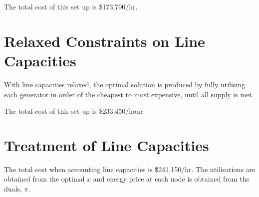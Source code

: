 \documentclass[11pt]{article}
\begin{document}
The total cost of this set up is \$173,790/hr.

\section{Relaxed Constraints on Line Capacities}
With line capacities relaxed, the optimal solution is produced by fully utilising each generator in order of the cheapest to most expensive, until all supply is met. 

The total cost of this set up is \$233,450/hour.  

\section{Treatment of Line Capacities}

The total cost when accounting line capacities is \$241,150/hr. The utilisations are obtained from the optimal $x$ and energy price at each node is obtained from the duals, $\pi$.
\end{document}

